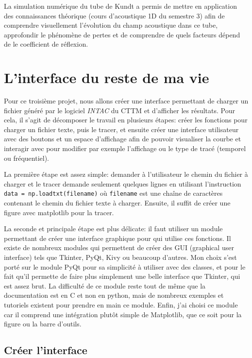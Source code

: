 \documentclass[a4paper,11pt]{article}
\begin{document}
La simulation numérique du tube de Kundt a permis de mettre en application des connaissances théorique (cours d'acoustique 1D du semestre 3) afin de comprendre visuellement l'évolution du champ acoustique dans ce tube, approfondir le phénomène de pertes et de comprendre de quels facteurs dépend de le coefficient de réflexion.

 
 
 
 
 


\newpage
\section{L'interface du reste de ma vie}

Pour ce troisième projet, nous allons créer une interface permettant de charger un fichier généré par le logiciel \textit{INTAC} du CTTM et d'afficher les résultats. Pour cela, il s'agit de décomposer le travail en plusieurs étapes: créer les fonctions pour charger un fichier texte, puis le tracer, et ensuite créer une interface utilisateur avec des boutons et un espace d'affichage afin de pouvoir visualiser la courbe et interagir avec pour modifier par exemple l'affichage ou le type de tracé (temporel ou fréquentiel). 

La première étape est assez simple: demander à l'utilisateur le chemin du fichier à charger et le tracer demande seulement quelques lignes en utilisant l'instruction \verb|data = np.loadtxt(filename)| où \verb|filename| est une chaîne de caractères contenant le chemin du fichier texte à charger. Ensuite, il suffit de créer une figure avec matplotlib pour la tracer.

La seconde et principale étape est plus délicate: il faut utiliser un module permettant de créer une interface graphique pour qui utilise ces fonctions. Il existe de nombreux modules qui permettent de créer des GUI (graphical user interface) tels que Tkinter, PyQt, Kivy ou beaucoup d'autres. Mon choix s'est porté sur le module PyQt pour sa simplicité à utiliser avec des classes, et pour le fait qu'il permette de faire plus simplement une belle interface que Tkinter, qui est assez brut. La difficulté de ce module reste tout de même que la documentation est en C et non en python, mais de nombreux exemples et tutoriels existent pour prendre en main ce module. Enfin, j'ai choisi ce module car il comprend une intégration plutôt simple de Matplotlib, que ce soit pour la figure ou la barre d'outils.

\subsection{Créer l'interface}
\end{document}
